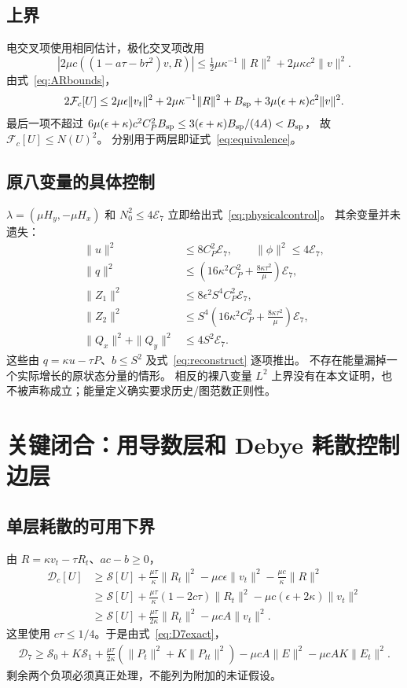 \documentclass[UTF8,a4paper,11pt,fontset=none]{ctexart}
\numberwithin{equation}{section}
\theoremstyle{definition}
\theoremstyle{definition}
\newcommand{\eps}{\epsilon}
\newcommand{\Ecal}{\mathcal E}
\newcommand{\Dcal}{\mathcal D}
\newcommand{\Fc}{\mathcal F_c}
\newcommand{\Dc}{\mathcal D_c}
\newcommand{\Sc}{\mathscr S}
\begin{document}
\subsection{上界}
电交叉项使用相同估计，极化交叉项改用
\[
 |2\mu c((1-a\tau-b\tau^2)v,R)|
 \le\tfrac12\mu\kappa^{-1}\|R\|^2+2\mu\kappa c^2\|v\|^2.
\]
由式~\eqref{eq:ARbounds}，
\[
 2\Fc[U]\le2\mu\eps\|v_t\|^2+2\mu\kappa^{-1}\|R\|^2
       +B_{\rm sp}+3\mu(\eps+\kappa)c^2\|v\|^2.
\]
最后一项不超过
$6\mu(\eps+\kappa)c^2C_P^2B_{\rm sp}
 \le3(\eps+\kappa)B_{\rm sp}/(4A)<B_{\rm sp}$，
故 $\Fc[U]\le N(U)^2$。
分别用于两层即证式~\eqref{eq:equivalence}。

\subsection{原八变量的具体控制}
$\lambda=(\mu H_y,-\mu H_x)$ 和 $N_0^2\le4\Ecal_7$ 立即给出式~\eqref{eq:physicalcontrol}。
其余变量并未遗失：
\begin{align}
 \|u\|^2&\le8C_P^2\Ecal_7,\qquad \|\phi\|^2\le4\Ecal_7,\label{eq:auxcontrol1}\\
 \|q\|^2&\le\left(16\kappa^2C_P^2+\frac{8\kappa\tau^2}{\mu}\right)\Ecal_7,\label{eq:auxcontrol2}\\
 \|Z_1\|^2&\le8\eps^2S^4C_P^2\Ecal_7,\label{eq:auxcontrol3}\\
 \|Z_2\|^2&\le S^4\left(16\kappa^2C_P^2+\frac{8\kappa\tau^2}{\mu}\right)\Ecal_7,\label{eq:auxcontrol4}\\
 \|Q_x\|^2+\|Q_y\|^2&\le4S^2\Ecal_7.\label{eq:auxcontrol5}
\end{align}
这些由 $q=\kappa u-\tau P$、$b\le S^2$ 及式~\eqref{eq:reconstruct} 逐项推出。
不存在能量漏掉一个实际增长的原状态分量的情形。
相反的裸八变量 $L^2$ 上界没有在本文证明，也不被声称成立；能量定义确实要求历史/图范数正则性。

\section{关键闭合：用导数层和 Debye 耗散控制边层}
\label{sec:closing}

\subsection{单层耗散的可用下界}
由 $R=\kappa v_t-\tau R_t$、$ac-b\ge0$，
\[
\begin{aligned}
 \Dc[U]&\ge\Sc[U]+\frac{\mu\tau}{\kappa}\|R_t\|^2
                     -\mu c\eps\|v_t\|^2-\frac{\mu c}{\kappa}\|R\|^2\\
 &\ge\Sc[U]+\frac{\mu\tau}{\kappa}(1-2c\tau)\|R_t\|^2
                     -\mu c(\eps+2\kappa)\|v_t\|^2\\
 &\ge\Sc[U]+\frac{\mu\tau}{2\kappa}\|R_t\|^2-\mu cA\|v_t\|^2.
\end{aligned}
\]
这里使用 $c\tau\le1/4$。于是由式~\eqref{eq:D7exact}，
\begin{equation}\label{eq:D7pre}
\begin{aligned}
 \Dcal_7\ge\Sc_0+K\Sc_1
 +\frac{\mu\tau}{2\kappa}(\|P_t\|^2+K\|P_{tt}\|^2)
 -\mu cA\|E\|^2-\mu cAK\|E_t\|^2.
\end{aligned}
\end{equation}
剩余两个负项必须真正处理，不能列为附加的未证假设。
\end{document}
